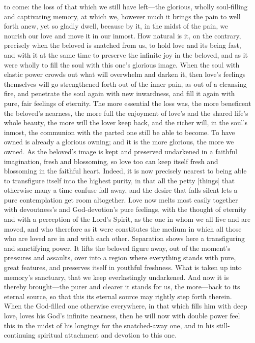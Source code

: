 \documentclass[12pt,a4paper]{book}
\begin{document}
to come: the loss of that which we still have left---the glorious, wholly
soul-filling and captivating memory, at which we, however much it brings the
pain to well forth anew, yet so gladly dwell, because by it, in the midst of
the pain, we nourish our love and move it in our inmost. How natural is it,
on the contrary, precisely when the beloved is snatched from us, to hold
love and its being fast, and with it at the same time to preserve the
infinite joy in the beloved, and as it were wholly to fill the soul with
this one's glorious image. When the soul with elastic power crowds out what
will overwhelm and darken it, then love's feelings themselves will go
strengthened forth out of the inner pain, as out of a cleansing fire, and
penetrate the soul again with new inwardness, and fill it again with pure,
fair feelings of eternity. The more essential the loss was, the more
beneficent the beloved's nearness, the more full the enjoyment of love's and
the shared life's whole beauty, the more will the lover keep back, and the
richer will, in the soul's inmost, the communion with the parted one still
be able to become. To have owned is already a glorious owning; and it is the
more glorious, the more we owned. As the beloved's image is kept and
preserved undarkened in a faithful imagination, fresh and blossoming, so
love too can keep itself fresh and blossoming in the faithful heart. Indeed,
it is now precisely nearest to being able to transfigure itself into the
highest purity, in that all the petty [things] that otherwise many a time
confuse fall away, and the desire that falls silent lets a pure
contemplation get room altogether. Love now melts most easily together with
devoutness's and God-devotion's pure feelings, with the thought of eternity
and with a perception of the Lord's Spirit, as the one in whom we all live
and are moved, and who therefore as it were constitutes the medium in which
all those who are loved are in and with each other. Separation shows here a
transfiguring and sanctifying power. It lifts the beloved figure away, out
of the moment's pressures and assaults, over into a region where everything
stands with pure, great features, and preserves itself in youthful
freshness. What is taken up into memory's sanctuary, that we keep
everlastingly undarkened. And now it is thereby brought---the purer and
clearer it stands for us, the more---back to its eternal source, so that this
its eternal source may rightly step forth therein. When the God-filled one
otherwise everywhere, in that which fills him with deep love, loves his
God's infinite nearness, then he will now with double power feel this in the
midst of his longings for the snatched-away one, and in his still-continuing
spiritual attachment and devotion to this one.
\end{document}
